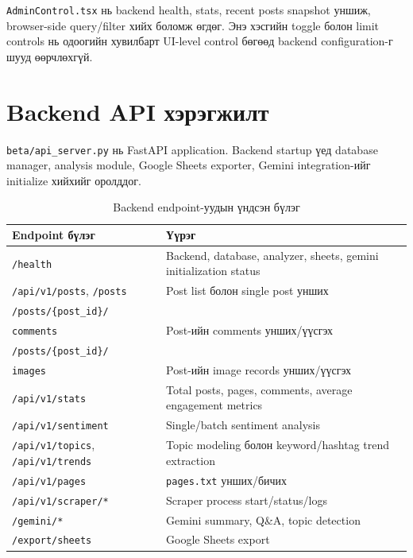\documentclass[
12pt,
oneside,
english,
onehalfspacing,
nolistspacing,
headsepline,
]{MUST-Thesis}
\begin{document}
\texttt{AdminControl.tsx} нь backend health, stats, recent posts snapshot уншиж, browser-side query/filter хийх боломж өгдөг. Энэ хэсгийн toggle болон limit controls нь одоогийн хувилбарт UI-level control бөгөөд backend configuration-г шууд өөрчлөхгүй.

\section{Backend API хэрэгжилт}

\texttt{beta/api\_server.py} нь FastAPI application. Backend startup үед database manager, analysis module, Google Sheets exporter, Gemini integration-ийг initialize хийхийг оролддог.

\begin{table}[H]
\centering
\caption{Backend endpoint-уудын үндсэн бүлэг}
\small
\renewcommand{\arraystretch}{1.25}
\begin{adjustbox}{max width=\textwidth}
\begin{tabular}{|L{4.4cm}|L{9.2cm}|}
\hline
{}\textbf{Endpoint бүлэг} & \textbf{Үүрэг} \\
\hline
\texttt{/health} & Backend, database, analyzer, sheets, gemini initialization status \\
\hline
\texttt{/api/v1/posts}, \texttt{/posts} & Post list болон single post унших \\
\hline
\texttt{/posts/\{post\_id\}/}\\
\texttt{comments} & Post-ийн comments унших/үүсгэх \\
\hline
\texttt{/posts/\{post\_id\}/}\\
\texttt{images} & Post-ийн image records унших/үүсгэх \\
\hline
\texttt{/api/v1/stats} & Total posts, pages, comments, average engagement metrics \\
\hline
\texttt{/api/v1/sentiment} & Single/batch sentiment analysis \\
\hline
\texttt{/api/v1/topics}, \texttt{/api/v1/trends} & Topic modeling болон keyword/hashtag trend extraction \\
\hline
\texttt{/api/v1/pages} & \texttt{pages.txt} унших/бичих \\
\hline
\texttt{/api/v1/scraper/*} & Scraper process start/status/logs \\
\hline
\texttt{/gemini/*} & Gemini summary, Q\&A, topic detection \\
\hline
\texttt{/export/sheets} & Google Sheets export \\
\hline
\end{tabular}
\end{adjustbox}
\normalsize
\end{table}
\end{document}
